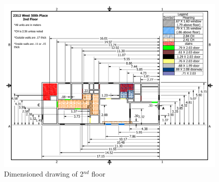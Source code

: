 \documentclass[11pt,oneside]{book}
\begin{document}
\begin{figure}[h!]
\centering
\includegraphics[width=.80\textwidth]{../Figures/50th_Place_2nd_Floor}
\caption {Dimensioned drawing of 2$^{nd}$ floor}
\label{fig:second_floor}
\end{figure}
\end{document}
